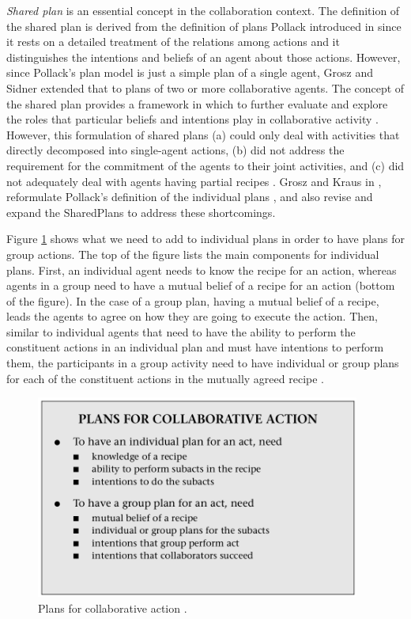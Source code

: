 \documentclass[12pt]{report}
\begin{document}
\textit{Shared plan} is an essential concept in the collaboration context.
The definition of the shared plan is derived from the definition of plans
Pollack introduced in \cite{pollack:plan-inference,
pollack:plan-mental-attitudes} since it rests on a detailed treatment of the
relations among actions and it distinguishes the intentions and beliefs of an
agent about those actions. However, since Pollack's plan model is just a simple
plan of a single agent, Grosz and Sidner extended that to plans of two or more
collaborative agents. The concept of the shared plan provides a framework in
which to further evaluate and explore the roles that particular beliefs and
intentions play in collaborative activity \cite{lochbaum:plan-models}. However,
this formulation of shared plans (a) could only deal with activities that
directly decomposed into single-agent actions, (b) did not address the
requirement for the commitment of the agents to their joint activities, and (c)
did not adequately deal with agents having partial recipes
\cite{grosz:collaboration}. Grosz and Kraus in \cite{grosz:collaboration},
reformulate Pollack's definition of the individual plans
\cite{pollack:plan-mental-attitudes}, and also revise and expand the SharedPlans
to address these shortcomings.

Figure \ref{fig:plans} shows what we need to add to individual plans in order to
have plans for group actions. The top of the figure lists the main components
for individual plans. First, an individual agent needs to know the recipe for an
action, whereas agents in a group need to have a mutual belief of a recipe for
an action (bottom of the figure). In the case of a group plan, having a mutual
belief of a recipe, leads the agents to agree on how they are going to execute
the action. Then, similar to individual agents that need to have the ability to
perform the constituent actions in an individual plan and must have intentions
to perform them, the participants in a group activity need to have individual or
group plans for each of the constituent actions in the mutually agreed recipe
\cite{grosz:collaborative-systems, grosz:plans-discourse}.

\begin{figure}[tbh]
  \center
  \includegraphics[width=0.95\textwidth]{figure/plans.png}
  \caption{Plans for collaborative action \cite{grosz:collaborative-systems}.}
  \label{fig:plans}
\end{figure}
\end{document}
